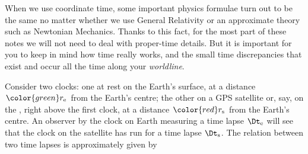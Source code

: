 \medskip

When we use coordinate time, some important physics formulae turn out to be the same no matter whether we use General Relativity or an approximate theory such as Newtonian Mechanics. Thanks to this fact, for the most part of these notes we will not need to deal with proper-time details. But it is important for you to keep in mind how time really works, and the small time discrepancies that exist and occur all the time along your \emph{worldline}.



\begin{exercise}[label={ex:clocks}]
  Consider two clocks: one at rest on the Earth's surface, at a distance $\color{green}r_{\text{e}}$ from the Earth's centre; the other on a GPS satellite or, say, on the , right above the first clock, at a distance $\color{red}r_{\text{s}}$ from the Earth's centre. An observer by the clock on Earth measuring a time lapse $\Dt_{\text{e}}$ will see that the clock on the satellite has run for a time lapse $\Dt_{\text{s}}$. The relation between two time lapses is approximately given by
\end{exercise}
